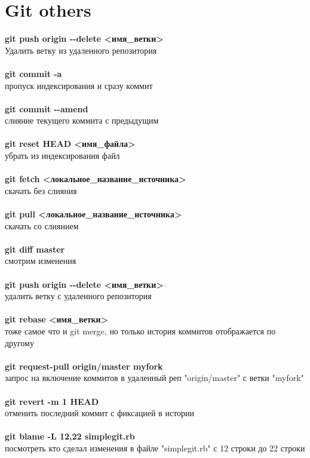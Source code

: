 \documentclass[a4paper, 12px]{report}
\begin{document}
\section{Git others}

\textbf{git push origin -\--delete <имя\_ветки>}\\Удалить ветку из удаленного репозитория\\\\
\textbf{git commit -a}\\пропуск индексирования и сразу коммит\\\\
\textbf{git commit -\--amend}\\слияние текущего коммита с предыдущим\\\\
\textbf{git reset HEAD <имя\_файла>}\\убрать из индексирования файл\\\\
\textbf{git fetch <локальное\_название\_источника>}\\скачать без слияния\\\\ 
\textbf{git pull <локальное\_название\_источника>}\\скачать со слиянием\\\\
\textbf{git diff master}\\смотрим изменения\\\\
\textbf{git push origin -\--delete <имя\_ветки>}\\удалить ветку с удаленного репозитория\\\\
\textbf{git rebase <имя\_ветки>}\\тоже самое что и git merge, но только история коммитов отображается по другому\\\\
\textbf{git request-pull origin/master myfork}\\запрос на включение коммитов в удаленный реп "origin/master" с ветки "myfork"\\\\
\textbf{git revert -m 1 HEAD}\\отменить последний коммит с фиксацией в истории\\\\
\textbf{git blame -L 12,22 simplegit.rb}\\посмотреть кто сделал изменения в файле "simplegit.rb" с 12 строки до 22 строки
\end{document}

